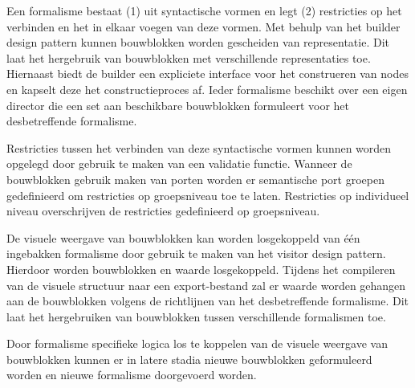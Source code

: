 Een formalisme bestaat (1) uit syntactische vormen en legt (2) restricties op het verbinden en het in elkaar voegen van deze vormen. Met behulp van het builder design pattern kunnen bouwblokken worden gescheiden van representatie. Dit laat het hergebruik van bouwblokken met verschillende representaties toe. Hiernaast biedt de builder een expliciete interface voor het construeren van nodes en kapselt deze het constructieproces af. Ieder formalisme beschikt over een eigen director die een set aan beschikbare bouwblokken formuleert voor het desbetreffende formalisme.

Restricties tussen het verbinden van deze syntactische vormen kunnen worden opgelegd door gebruik te maken van een validatie functie. Wanneer de bouwblokken gebruik maken van porten worden er semantische port groepen gedefinieerd om restricties op groepsniveau toe te laten. Restricties op individueel niveau overschrijven de restricties gedefinieerd op groepsniveau. 

De visuele weergave van bouwblokken kan worden losgekoppeld van één ingebakken formalisme door gebruik te maken van het visitor design pattern. Hierdoor worden bouwblokken en waarde losgekoppeld. Tijdens het compileren van de visuele structuur naar een export-bestand zal er waarde worden gehangen aan de bouwblokken volgens de richtlijnen van het desbetreffende formalisme. Dit laat het hergebruiken van bouwblokken tussen verschillende formalismen toe.

Door formalisme specifieke logica los te koppelen van de visuele weergave van bouwblokken kunnen er in latere stadia nieuwe bouwblokken geformuleerd worden en nieuwe formalisme doorgevoerd worden.